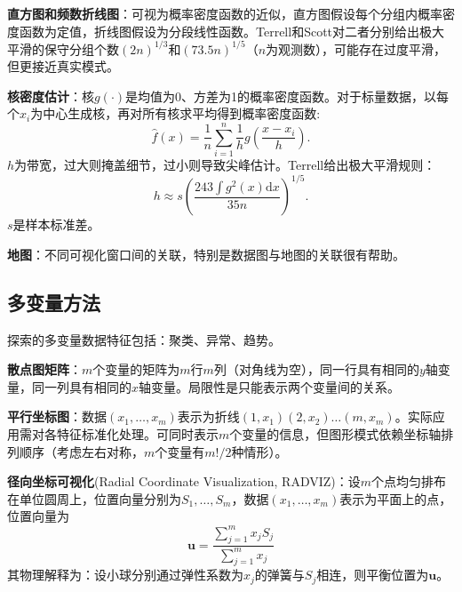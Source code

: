 \par\textbf{直方图和频数折线图}：可视为概率密度函数的近似，直方图假设每个分组内概率密度函数为定值，折线图假设为分段线性函数。Terrell和Scott对二者分别给出极大平滑的保守分组个数$(2n)^{1/3}$和$(73.5n)^{1/5}$（$n$为观测数），可能存在过度平滑，但更接近真实模式。

\par \textbf{核密度估计}：核$g(\cdot)$是均值为0、方差为1的概率密度函数。对于标量数据，以每个$x_i$为中心生成核，再对所有核求平均得到概率密度函数:
\begin{equation}
    \hat{f}(x)=\frac{1}{n}\sum_{i=1}^n \frac{1}{h}g\left(\frac{x-x_i}{h}\right).
\end{equation}
$h$为带宽，过大则掩盖细节，过小则导致尖峰估计。Terrell给出极大平滑规则：
\begin{equation}
    h \approx s\left(\frac{243\int g^2(x)\text{d} x}{35n}\right)^{1/5}.
\end{equation}
$s$是样本标准差。

\par \textbf{地图}：不同可视化窗口间的关联，特别是数据图与地图的关联很有帮助。

\subsection{多变量方法}

\par 探索的多变量数据特征包括：聚类、异常、趋势。

\par \textbf{散点图矩阵}：$m$个变量的矩阵为$m$行$m$列（对角线为空），同一行具有相同的$y$轴变量，同一列具有相同的$x$轴变量。局限性是只能表示两个变量间的关系。

\par \textbf{平行坐标图}：数据$(x_1,\dots,x_m)$表示为折线$(1,x_1)(2,x_2)\dots(m,x_m)$。实际应用需对各特征标准化处理。可同时表示$m$个变量的信息，但图形模式依赖坐标轴排列顺序（考虑左右对称，$m$个变量有$m!/2$种情形）。

\par \textbf{径向坐标可视化}(Radial Coordinate Visualization, RADVIZ)：设$m$个点均匀排布在单位圆周上，位置向量分别为$S_1,\dots,S_m$，数据$(x_1,\dots,x_m)$表示为平面上的点，位置向量为
\begin{equation}
    \mathbf{u}=\frac{\sum_{j=1}^m x_j S_j}{\sum_{j=1}^m x_j}
\end{equation}
其物理解释为：设小球分别通过弹性系数为$x_j$的弹簧与$S_j$相连，则平衡位置为$\mathbf{u}$。


